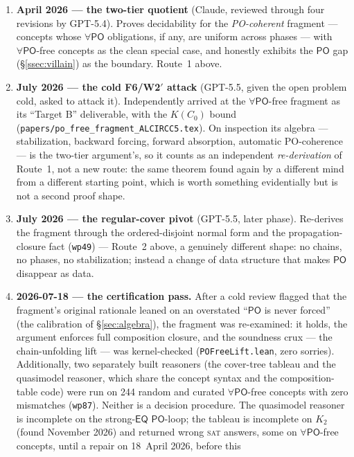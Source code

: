 \documentclass[11pt]{article}
\newcommand{\PO}{\ensuremath{\mathsf{PO}}}
\newcommand{\EQ}{\ensuremath{\mathsf{EQ}}}
\newcommand{\code}[1]{\texttt{#1}}
\begin{document}
\begin{enumerate}
\item \textbf{April 2026 --- the two-tier quotient} (Claude, reviewed
  through four revisions by GPT-5.4). Proves decidability for the
  \emph{PO-coherent} fragment --- concepts whose $\forall\PO$
  obligations, if any, are uniform across phases --- with
  $\forall\PO$-free concepts as the clean special case, and honestly
  exhibits the $\PO$ gap (\S\ref{ssec:villain}) as the boundary.
  Route~1 above.
\item \textbf{July 2026 --- the cold F6/W2$'$ attack} (GPT-5.5, given
  the open problem cold, asked to attack it). Independently arrived at
  the $\forall\PO$-free fragment as its ``Target B'' deliverable, with
  the $K(C_0)$ bound (\code{papers/po\_free\_fragment\_ALCIRCC5.tex}).
  On inspection its algebra --- stabilization, backward forcing,
  forward absorption, automatic PO-coherence --- is the two-tier
  argument's, so it counts as an independent \emph{re-derivation} of
  Route~1, not a new route: the same theorem found again by a different
  mind from a different starting point, which is worth something
  evidentially but is not a second proof shape.
\item \textbf{July 2026 --- the regular-cover pivot} (GPT-5.5, later
  phase). Re-derives the fragment through the ordered-disjoint normal
  form and the propagation-closure fact (\code{wp49}) --- Route~2
  above, a genuinely different shape: no chains, no phases, no
  stabilization; instead a change of data structure that makes $\PO$
  disappear as data.
\item \textbf{2026-07-18 --- the certification pass.} After a cold
  review flagged that the fragment's original rationale leaned on an
  overstated ``$\PO$ is never forced'' (the calibration of
  \S\ref{sec:algebra}), the fragment was re-examined: it holds, the
  argument enforces full composition closure, and the soundness crux
  --- the chain-unfolding lift --- was kernel-checked
  (\code{POFreeLift.lean}, zero sorries). Additionally, two separately built
  reasoners (the cover-tree tableau and the quasimodel reasoner, which share
  the concept syntax and the composition-table code) were run on 244 random
  and curated $\forall\PO$-free concepts with zero mismatches (\code{wp87}).
  Neither is a decision procedure. The quasimodel reasoner is incomplete on
  the strong-$\EQ$ $\PO$-loop; the tableau is incomplete on $K_2$ (found
  November 2026) and returned wrong \textsc{sat} answers, some on
  $\forall\PO$-free concepts, until a repair on 18~April 2026, before this

\end{enumerate}
\end{document}
